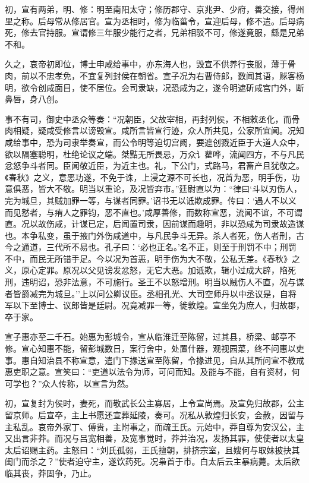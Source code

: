 \documentclass[]{article}
\begin{document}
初，宣有两弟，明、修：明至南阳太守；修历郡守、京兆尹、少府，善交接，得州里之称。后母常从修居官。宣为丞相时，修为临菑令，宣迎后母，修不遣。后母病死，修去官持服。宣谓修三年服少能行之者，兄弟相驳不可，修遂竟服，繇是兄弟不和。

久之，哀帝初即位，博士申咸给事中，亦东海人也，毁宣不供养行丧服，薄于骨肉，前以不忠孝免，不宜复列封侯在朝省。宣子况为右曹侍郎，数闻其语，赇客杨明，欲令创咸面目，使不居位。会司隶缺，况恐咸为之，遂令明遮斫咸宫门外，断鼻唇，身八创。

事不有司，御史中丞众等奏：``况朝臣，父故宰相，再封列侯，不相敕丞化，而骨肉相疑，疑咸受修言以谤毁宣。咸所言皆宣行迹，众人所共见，公家所宜闻。况知咸给事中，恐为司隶举奏宣，而公令明等迫切宫阙，要遮创戮近臣于大道人众中，欲以隔塞聪明，杜绝论议之端。桀黠无所畏忌，万众讠雚哗，流闻四方，不与凡民忿怒争斗者同。臣闻敬近臣，为近主也。礼，下公门，式路马，君畜产且犹敬之。《春秋》之义，意恶功遂，不免于诛，上浸之源不可长也，况首为恶，明手伤，功意俱恶，皆大不敬。明当以重论，及况皆弃市。''廷尉直以为：``律曰`斗以刃伤人，完为城旦，其贼加罪一等，与谋者同罪。'诏书无以诋欺成罪。传曰：`遇人不以义而见慭者，与痏人之罪钧，恶不直也。'咸厚善修，而数称宣恶，流闻不谊，不可谓直。况以故伤咸，计谋已定，后闻置司隶，因前谋而趣明，非以恐咸为司隶故造谋也。本争私变，虽于掖门外伤咸道中，与凡民争斗无异。杀人者死，伤人者刑，古今之通道，三代所不易也。孔子曰：`必也正名。'名不正，则至于刑罚不中；刑罚不中，而民无所错手足。今以况为首恶，明手伤为大不敬，公私无差。《春秋》之义，原心定罪。原况以父见谤发忿怒，无它大恶。加诋欺，辑小过成大辟，陷死刑，违明诏，恐非法意，不可施行。圣王不以怒增刑。明当以贼伤人不直，况与谋者皆爵减完为城旦。''上以问公卿议臣。丞相孔光、大司空师丹以中丞议是，自将军以下至博士、议郎皆是廷尉。况竟减罪一等，徙敦煌。宣坐免为庶人，归故郡，卒于家。

宣子惠亦至二千石。始惠为彭城令，宣从临淮迁至陈留，过其县，桥梁、邮亭不修。宣心知惠不能，留彭城数日，案行舍中，处置什器，观视园菜，终不问惠以吏事。惠自知治县不称宣意，遣门下掾送宣至陈留，令掾进见，自从其所问宣不教戒惠吏职之意。宣笑曰：``吏道以法令为师，可问而知。及能与不能，自有资材，何可学也？''众人传称，以宣言为然。

初，宣复封为侯时，妻死，而敬武长公主寡居，上令宣尚焉。及宣免归故郡，公主留京师。后宣卒，主上书愿还宣葬延陵，奏可。况私从敦煌归长安，会赦，因留与主私乱。哀帝外家丁、傅贵，主附事之，而疏王氏。元始中，莽自尊为安汉公，主又出言非莽。而况与吕宽相善，及宽事觉时，莽并治况，发扬其罪，使使者以太皇太后诏赐主药。主怒曰：``刘氏孤弱，王氏擅朝，排挤宗室，且嫂何与取妹披抉其闺门而杀之？''使者迫守主，遂饮药死。况枭首于市。白太后云主暴病薨。太后欲临其丧，莽固争，乃止。
\end{document}
